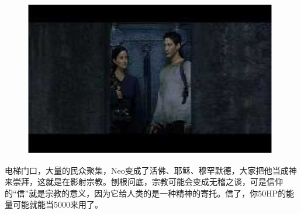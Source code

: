 \documentclass{ctexart}
\begin{document}
\begin{figure}[htb]
\centering
\includegraphics[width=0.5\linewidth]{fig/read_reloaded-38}
\end{figure}

电梯门口，大量的民众聚集，Neo变成了活佛、耶稣、穆罕默德，大家把他当成神来崇拜，这就是在影射宗教。刨根问底，宗教可能会变成无稽之谈，可是信仰的“信”就是宗教的意义，因为它给人类的是一种精神的寄托。信了，你50HP的能量可能就能当5000来用了。
\end{document}
